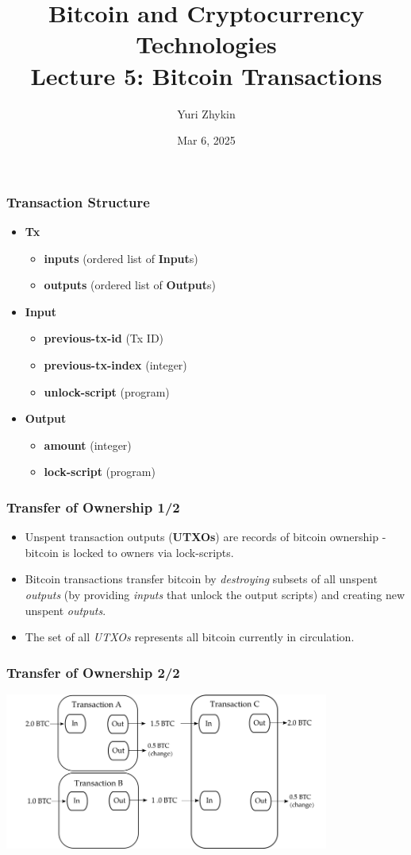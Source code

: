 \documentclass{beamer}
\title{
  Bitcoin and Cryptocurrency Technologies \\
  Lecture 5: Bitcoin Transactions
}
\author{Yuri Zhykin}
\date{Mar 6, 2025}
\begin{document}
\frame{\titlepage}

\begin{frame}
  \frametitle{Transaction Structure}
  \begin{itemize}
  \item \textbf{Tx}
    \begin{itemize}
    \item \textbf{inputs} (ordered list of \textbf{Input}s)
    \item \textbf{outputs} (ordered list of \textbf{Output}s)
    \end{itemize}
  \item \textbf{Input}
    \begin{itemize}
    \item \textbf{previous-tx-id} (Tx ID)
    \item \textbf{previous-tx-index} (integer)
    \item \textbf{unlock-script} (program)
    \end{itemize}
  \item \textbf{Output}
    \begin{itemize}
    \item \textbf{amount} (integer)
    \item \textbf{lock-script} (program)
    \end{itemize}
  \end{itemize}
\end{frame}

\begin{frame}[fragile]
  \frametitle{Transfer of Ownership 1/2}
  \begin{itemize}
  \item Unspent transaction outputs (\textbf{UTXOs}) are records of bitcoin
    ownership - bitcoin is locked to owners via lock-scripts.
  \item Bitcoin transactions transfer bitcoin by \textit{destroying} subsets of
    all unspent \textit{outputs} (by providing \textit{inputs} that unlock the
    output scripts) and creating new unspent \textit{outputs}.
  \item The set of all \textit{UTXOs} represents all bitcoin currently in
    circulation.
  \end{itemize}
\end{frame}

\begin{frame}[fragile]
  \frametitle{Transfer of Ownership 2/2}
  \begin{center}
    \includegraphics[width=0.8\textwidth]{transactions}
  \end{center}
\end{frame}
\end{document}
